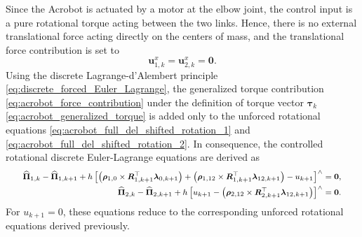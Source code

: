 Since the Acrobot is actuated by a motor at the elbow joint, the control input is a
pure rotational torque acting between the two links. Hence, there is no external
translational force acting directly on the centers of mass, and the translational
force contribution is set to
\begin{equation}
    \bm{u}^{x}_{1,k}
    =
    \bm{u}^{x}_{2,k}
    =
    \bm{0}.
    \label{eq:acrobot_zero_translational_force}
\end{equation}
Using the discrete Lagrange-d'Alembert principle \eqref{eq:discrete_forced_Euler_Lagrange}, the generalized torque
contribution \eqref{eq:acrobot_force_contribution} under the definition of torque vector $\bm{\tau}_k$ \eqref{eq:acrobot_generalized_torque} is added only to the unforced 
rotational equations \eqref{eq:acrobot_full_del_shifted_rotation_1} and \eqref{eq:acrobot_full_del_shifted_rotation_2}. 
In consequence, the controlled rotational discrete Euler-Lagrange equations are derived as
\begin{subequations}
\label{eq:forced_acrobot_rotational_equations}
\begingroup
\footnotesize
\setlength{\jot}{0.25em}
\begin{align}
    \bm{\widehat{\Pi}}_{1,k}
    -
    \bm{\widehat{\Pi}}_{1,k+1}
    +
    h
    \left[
    \left(
    \bm{\rho}_{1,0}
    \times
    \bm{R}_{1,k+1}^{\top}\bm{\lambda}_{0,k+1}
    \right)
    +
    \left(
    \bm{\rho}_{1,12}
    \times
    \bm{R}_{1,k+1}^{\top}\bm{\lambda}_{12,k+1}
    \right)
    -
    u_{k+1}
    \right]^{\wedge}
    &=
    \bm{0},
    \label{eq:forced_acrobot_rotation_link1}
    \\
    \bm{\widehat{\Pi}}_{2,k}
    -
    \bm{\widehat{\Pi}}_{2,k+1}
    +
    h
    \left[
    u_{k+1}
    -
    \left(
    \bm{\rho}_{2,12}
    \times
    \bm{R}_{2,k+1}^{\top}\bm{\lambda}_{12,k+1}
    \right)
    \right]^{\wedge}
    &=
    \bm{0}.
    \label{eq:forced_acrobot_rotation_link2}
\end{align}
\endgroup
\end{subequations}
For \(u_{k+1}=0\), these equations reduce to the corresponding unforced rotational
equations derived previously.